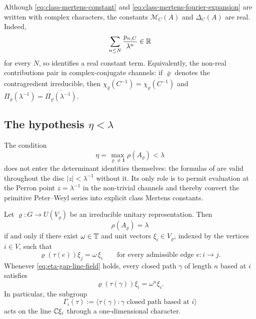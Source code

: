 \begin{remark}
  \label{rem:class-mertens-constants-real}
  Although \eqref{eq:class-mertens-constant} and
  \eqref{eq:class-mertens-fourier-expansion} are written with complex
  characters, the constants \(\mathcal M_C(A)\) and \(\Delta_C(A)\) are
  real. Indeed,
  \[
    \sum_{n\le N}\frac{p_{n,C}}{\lambda^n}\in\mathbb{R}
  \]
  for every \(N\), so  identifies a
  real constant term. Equivalently, the non-real contributions pair in
  complex-conjugate channels: if \(\overline{\varrho}\) denotes the
  contragredient irreducible, then
  \(\chi_{\overline{\varrho}}(C^{-1})
  =\overline{\chi_\varrho(C^{-1})}\) and
  \(\Pi_{\overline{\varrho}}(\lambda^{-1})
  =\overline{\Pi_\varrho(\lambda^{-1})}\).
\end{remark}

\subsection{The hypothesis \texorpdfstring{$\eta<\lambda$}{eta<lambda}}
\label{subsec:eta-gap}

\begin{remark}
  \label{rem:twisted-spectral-gap-role}
  The condition
  \[
    \eta=\max_{\varrho\neq\mathbf 1}\rho(A_\varrho)<\lambda
  \]
  does not enter the determinant identities themselves: the formulas of
  are valid throughout the disc \(|z|<\lambda^{-1}\) without it. Its
  only role is to permit evaluation at the Perron point
  \(z=\lambda^{-1}\) in the non-trivial channels and thereby convert the
  primitive Peter--Weyl series into explicit class Mertens constants.
\end{remark}

\begin{theorem}
  \label{thm:eta-gap-rigidity}
  Let \(\varrho:G\to U(V_\varrho)\) be an irreducible unitary
  representation. Then
  \[
    \rho(A_\varrho)=\lambda
  \]
  if and only if there exist \(\omega\in\mathbb{T}\) and unit vectors
  \(\xi_i\in V_\varrho\), indexed by the vertices \(i\in V\), such that
  \begin{equation}\label{eq:eta-gap-line-field}
    \varrho(\tau(e))\xi_j=\omega\,\xi_i
    \qquad
    \text{for every admissible edge } e:i\to j.
  \end{equation}
  Whenever \eqref{eq:eta-gap-line-field} holds, every closed path
  \(\gamma\) of length \(n\) based at \(i\) satisfies
  \begin{equation}\label{eq:eta-gap-loop-character}
    \varrho(\tau(\gamma))\xi_i=\omega^n\xi_i.
  \end{equation}
  In particular, the subgroup
  \[
    \Gamma_i(\tau)
    :=
    \bigl\langle \tau(\gamma):
      \gamma \text{ closed path based at } i
    \bigr\rangle
  \]
  acts on the line \(\mathbb{C}\xi_i\) through a one-dimensional character.
\end{theorem}

